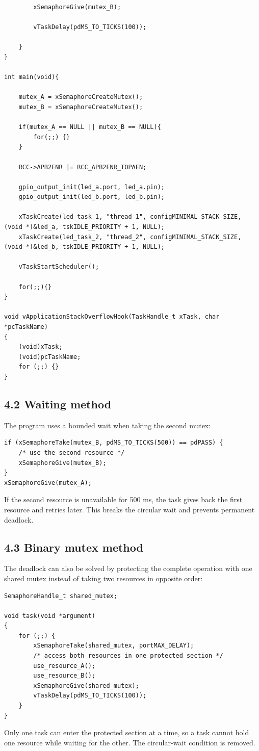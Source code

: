 ﻿\documentclass[12pt,a4paper]{article}
\begin{document}
\begin{lstlisting}
        xSemaphoreGive(mutex_B);

        vTaskDelay(pdMS_TO_TICKS(100));

    }
}

int main(void){

    mutex_A = xSemaphoreCreateMutex();
    mutex_B = xSemaphoreCreateMutex();

    if(mutex_A == NULL || mutex_B == NULL){
        for(;;) {}
    }

    RCC->APB2ENR |= RCC_APB2ENR_IOPAEN;

    gpio_output_init(led_a.port, led_a.pin);
    gpio_output_init(led_b.port, led_b.pin);

    xTaskCreate(led_task_1, "thread_1", configMINIMAL_STACK_SIZE, (void *)&led_a, tskIDLE_PRIORITY + 1, NULL);
    xTaskCreate(led_task_2, "thread_2", configMINIMAL_STACK_SIZE, (void *)&led_b, tskIDLE_PRIORITY + 1, NULL);

    vTaskStartScheduler();

    for(;;){}
}

void vApplicationStackOverflowHook(TaskHandle_t xTask, char *pcTaskName)
{
    (void)xTask;
    (void)pcTaskName;
    for (;;) {}
}
\end{lstlisting}

\subsection*{4.2 Waiting method}
The program uses a bounded wait when taking the second mutex:
\begin{lstlisting}
if (xSemaphoreTake(mutex_B, pdMS_TO_TICKS(500)) == pdPASS) {
    /* use the second resource */
    xSemaphoreGive(mutex_B);
}
xSemaphoreGive(mutex_A);
\end{lstlisting}
If the second resource is unavailable for 500 ms, the task gives back the
first resource and retries later. This breaks the circular wait and prevents
permanent deadlock.

\subsection*{4.3 Binary mutex method}
The deadlock can also be solved by protecting the complete operation with one
shared mutex instead of taking two resources in opposite order:
\begin{lstlisting}
SemaphoreHandle_t shared_mutex;

void task(void *argument)
{
    for (;;) {
        xSemaphoreTake(shared_mutex, portMAX_DELAY);
        /* access both resources in one protected section */
        use_resource_A();
        use_resource_B();
        xSemaphoreGive(shared_mutex);
        vTaskDelay(pdMS_TO_TICKS(100));
    }
}
\end{lstlisting}
Only one task can enter the protected section at a time, so a task cannot hold
one resource while waiting for the other. The circular-wait condition is
removed.
\end{document}
